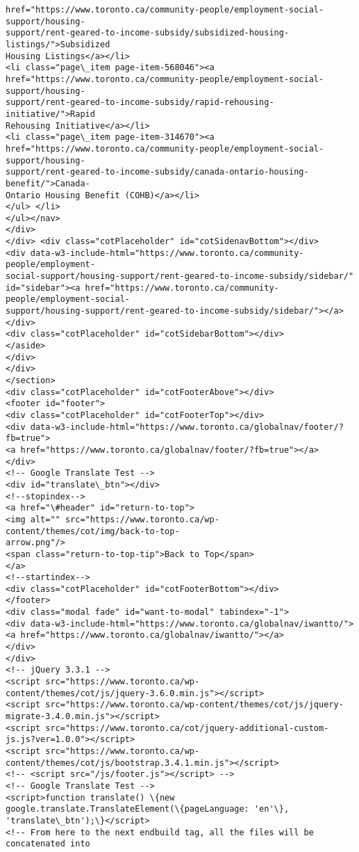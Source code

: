 \documentclass[11pt]{article}
\begin{document}
\begin{Verbatim}[commandchars=\\\{\}]
href="https://www.toronto.ca/community-people/employment-social-support/housing-
support/rent-geared-to-income-subsidy/subsidized-housing-listings/">Subsidized
Housing Listings</a></li>
<li class="page\_item page-item-568046"><a
href="https://www.toronto.ca/community-people/employment-social-support/housing-
support/rent-geared-to-income-subsidy/rapid-rehousing-initiative/">Rapid
Rehousing Initiative</a></li>
<li class="page\_item page-item-314670"><a
href="https://www.toronto.ca/community-people/employment-social-support/housing-
support/rent-geared-to-income-subsidy/canada-ontario-housing-benefit/">Canada-
Ontario Housing Benefit (COHB)</a></li>
</ul> </li>
</ul></nav>
</div>
</div> <div class="cotPlaceholder" id="cotSidenavBottom"></div>
<div data-w3-include-html="https://www.toronto.ca/community-people/employment-
social-support/housing-support/rent-geared-to-income-subsidy/sidebar/"
id="sidebar"><a href="https://www.toronto.ca/community-people/employment-social-
support/housing-support/rent-geared-to-income-subsidy/sidebar/"></a></div>
<div class="cotPlaceholder" id="cotSidebarBottom"></div>
</aside>
</div>
</div>
</section>
<div class="cotPlaceholder" id="cotFooterAbove"></div>
<footer id="footer">
<div class="cotPlaceholder" id="cotFooterTop"></div>
<div data-w3-include-html="https://www.toronto.ca/globalnav/footer/?fb=true">
<a href="https://www.toronto.ca/globalnav/footer/?fb=true"></a>
</div>
<!-- Google Translate Test -->
<div id="translate\_btn"></div>
<!--stopindex-->
<a href="\#header" id="return-to-top">
<img alt="" src="https://www.toronto.ca/wp-content/themes/cot/img/back-to-top-
arrow.png"/>
<span class="return-to-top-tip">Back to Top</span>
</a>
<!--startindex-->
<div class="cotPlaceholder" id="cotFooterBottom"></div>
</footer>
<div class="modal fade" id="want-to-modal" tabindex="-1">
<div data-w3-include-html="https://www.toronto.ca/globalnav/iwantto/">
<a href="https://www.toronto.ca/globalnav/iwantto/"></a>
</div>
</div>
<!-- jQuery 3.3.1 -->
<script src="https://www.toronto.ca/wp-
content/themes/cot/js/jquery-3.6.0.min.js"></script>
<script src="https://www.toronto.ca/wp-content/themes/cot/js/jquery-
migrate-3.4.0.min.js"></script>
<script src="https://www.toronto.ca/cot/jquery-additional-custom-
js.js?ver=1.0.0"></script>
<script src="https://www.toronto.ca/wp-
content/themes/cot/js/bootstrap.3.4.1.min.js"></script>
<!-- <script src="/js/footer.js"></script> -->
<!-- Google Translate Test -->
<script>function translate() \{new
google.translate.TranslateElement(\{pageLanguage: 'en'\},
'translate\_btn');\}</script>
<!-- From here to the next endbuild tag, all the files will be concatenated into

\end{Verbatim}
\end{document}
